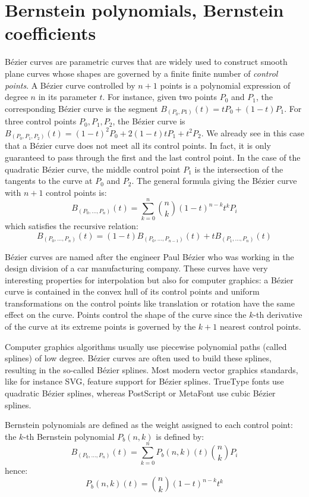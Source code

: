 \documentclass{mscs}
\begin{document}
\section{Bernstein polynomials, Bernstein coefficients}
\label{sec:bernsteindef}
B\'ezier curves \cite{bezier} are parametric curves that are widely used
to construct
smooth plane curves whose shapes are governed by a finite finite number
of \emph{control points}. A B\'ezier curve controlled by $n+1$ points is
a polynomial expression of degree $n$ in its parameter $t$. For
instance, given two points $P_0$ and $P_1$, the corresponding B\'ezier
curve is the segment $B_{(P_0, P1)}(t) = tP_0 + (1 - t)P_1$. For three control
points $P_0, P_1, P_2$, the B\'ezier curve is
$B_{(P_0, P_1, P_2)}(t) = (1 - t)^2P_0 + 2(1 - t)tP_1 + t^2P_2$.
We already see in this case that a B\'ezier
curve does not meet all its control points. In fact, it is only
guaranteed to pass through the first and the last control point. In
the case of the quadratic B\'ezier curve, the middle control point $P_1$
is the intersection of the tangents to the curve at $P_0$ and
$P_2$. The general formula giving the B\'ezier curve with $n+1$ control
points is:
$$B_{(P_0, \dots,P_n)}(t) = \sum_{k = 0}^n \binom{n}{k}(1 -t)^{n - k}t^k P_i$$
which satisfies the recursive relation:
$$B_{(P_0,\dots, P_n)}(t) = (1 - t)B_{(P_0, \dots, P_{n-1})}(t) + tB_{(P_1, \dots, P_n)}(t)$$

B\'ezier curves are named after the engineer Paul B\'ezier who was working
in the design division of a car manufacturing company. These curves have very interesting properties for
interpolation but also for computer graphics: a B\'ezier curve is
contained in the convex hull of its control
points and uniform transformations on the control points like
translation or rotation have the same effect on the curve. Points
control the shape of the curve since the $k$-th derivative of the
curve at its extreme points is governed by the $k+1$ nearest
control points.

Computer graphics algorithms usually use piecewise polynomial paths
(called splines) of  low degree. B\'ezier curves are often used to
build these splines, resulting in the so-called B\'ezier splines. Most
modern vector graphics standards, like for instance SVG, feature
support for B\'ezier splines.
TrueType fonts use quadratic B\'ezier
splines, whereas PostScript or MetaFont \cite{metafont} use cubic
B\'ezier splines.


Bernstein polynomials are defined as the weight assigned to each
control point: the $k$-th Bernstein polynomial $P_b(n, k)$ is defined by:
$$B_{(P_0, \dots,P_n)}(t) = \sum_{k = 0}^n P_b(n, k)(t)\binom{n}{k}P_i$$
hence:
$$P_b(n,  k)(t) = \binom{n}{k}(1 -t)^{n - k}t^k$$
\end{document}
